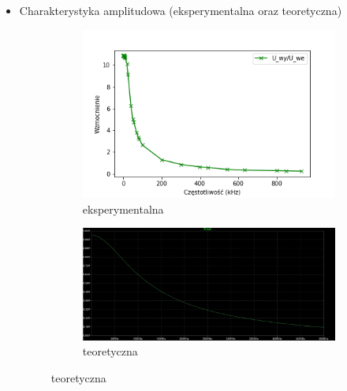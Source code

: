 \begin{itemize}
    \item Charakterystyka amplitudowa (eksperymentalna oraz teoretyczna)
    \begin{figure}[H]
        \centering
        \begin{subfigure}[h]{0.45\textwidth}
            \includegraphics[width=\textwidth]{img/osciloscope/charakterystyka/uwy-we.png}
            \caption*{eksperymentalna}
        \end{subfigure}
        \begin{subfigure}[h]{0.45\textwidth}
            \includegraphics[width=\textwidth]{img/theoretical/charakterystyka_amplitudowa_wzmacniacz.png}
            \caption*{teoretyczna}
        \end{subfigure}
    \end{figure}
    

\end{itemize}
